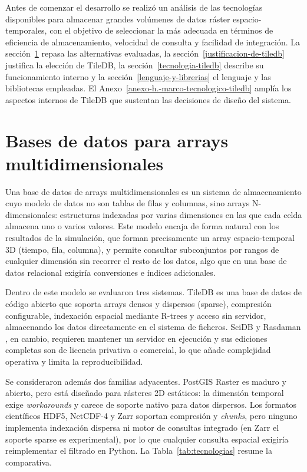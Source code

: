 Antes de comenzar el desarrollo se realizó un análisis de las tecnologías disponibles para almacenar grandes volúmenes de datos ráster espacio-temporales, con el objetivo de seleccionar la más adecuada en términos de eficiencia de almacenamiento, velocidad de consulta y facilidad de integración. La sección~\ref{bases-de-datos-para-arrays-multidimensionales} repasa las alternativas evaluadas, la sección~\ref{justificacion-de-tiledb} justifica la elección de TileDB, la sección~\ref{tecnologia-tiledb} describe su funcionamiento interno y la sección~\ref{lenguaje-y-librerias} el lenguaje y las bibliotecas empleadas. El Anexo~\ref{anexo-h.-marco-tecnologico-tiledb} amplía los aspectos internos de TileDB que sustentan las decisiones de diseño del sistema.

\section{Bases de datos para arrays multidimensionales}\label{bases-de-datos-para-arrays-multidimensionales}

Una base de datos de arrays multidimensionales es un sistema de almacenamiento cuyo modelo de datos no son tablas de filas y columnas, sino arrays N-dimensionales: estructuras indexadas por varias dimensiones en las que cada celda almacena uno o varios valores. Este modelo encaja de forma natural con los resultados de la simulación, que forman precisamente un array espacio-temporal 3D (tiempo, fila, columna), y permite consultar subconjuntos por rangos de cualquier dimensión sin recorrer el resto de los datos, algo que en una base de datos relacional exigiría conversiones e índices adicionales.

Dentro de este modelo se evaluaron tres sistemas. TileDB \cite{tiledb_github, tiledb_web, tiledb_cmu, tiledb_youtube} es una base de datos de código abierto que soporta arrays densos y dispersos (sparse), compresión configurable, indexación espacial mediante R-trees y acceso sin servidor, almacenando los datos directamente en el sistema de ficheros. SciDB \cite{scidb, scidb_docs} y Rasdaman \cite{rasdaman}, en cambio, requieren mantener un servidor en ejecución y sus ediciones completas son de licencia privativa o comercial, lo que añade complejidad operativa y limita la reproducibilidad.

Se consideraron además dos familias adyacentes. PostGIS Raster \cite{postgis_raster} es maduro y abierto, pero está diseñado para rásteres 2D estáticos: la dimensión temporal exige \textit{workarounds} y carece de soporte nativo para datos dispersos. Los formatos científicos HDF5, NetCDF-4 y Zarr soportan compresión y \textit{chunks}, pero ninguno implementa indexación dispersa ni motor de consultas integrado (en Zarr el soporte sparse es experimental), por lo que cualquier consulta espacial exigiría reimplementar el filtrado en Python. La Tabla~\ref{tab:tecnologias} resume la comparativa.

